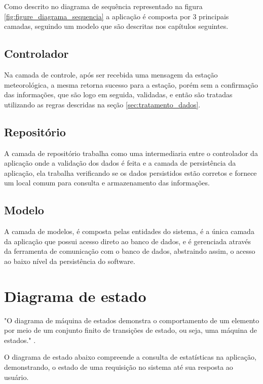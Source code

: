 Como descrito no diagrama de sequência representado na figura \ref{fig:figure_diagrama_sequencia} a aplicação é composta por 3 principais camadas, seguindo um modelo que são descritas nos capítulos seguintes.

\subsection{Controlador}

Na camada de controle, após ser recebida uma mensagem da estação meteorológica, a mesma retorna sucesso para a estação, porém sem a confirmação das informações, que são logo em seguida, validadas, e então são tratadas utilizando as regras descridas na seção \ref{sec:tratamento_dados}.

\subsection{Repositório}

A camada de repositório trabalha como uma intermediaria entre o controlador da aplicação onde a validação dos dados é feita e a camada de persistência da aplicação, ela trabalha verificando se os dados persistidos estão corretos e fornece um local comum para consulta e armazenamento das informações.

\subsection{Modelo}

A camada de modelos, é composta pelas entidades do sistema, é a única camada da aplicação que possui acesso direto ao banco de dados, e é gerenciada através da ferramenta de comunicação com o banco de dados, abstraindo assim, o acesso ao baixo nível da persistência do software.

\section{Diagrama de estado}
\label{sec:diagrama_estado}

"O diagrama de máquina de estados demonstra o comportamento de um elemento por meio de um conjunto finito de transições de estado, ou seja, uma máquina de estados." \cite{uml_pratica}.

O diagrama de estado abaixo compreende a consulta de estatísticas na aplicação, demonstrando, o estado de uma requisição no sistema até sua resposta ao usuário.

